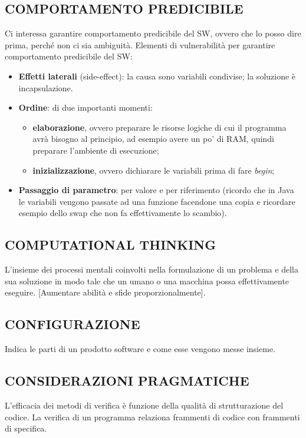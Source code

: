 		\subsection{COMPORTAMENTO PREDICIBILE}	\label{comportamentopredicibile} %
		Ci interessa garantire comportamento predicibile del SW, ovvero che lo posso dire prima, perché non ci sia ambiguità. Elementi di vulnerabilità per garantire comportamento predicibile del SW:
		\begin{itemize}
			\item \textbf{Effetti laterali} (side-effect): la causa sono variabili condivise; la soluzione è incapsulazione.
			\item \textbf{Ordine}: di due importanti momenti:
			\begin{itemize}
				\item \textbf{elaborazione}, ovvero preparare le risorse logiche di cui il programma avrà bisogno al principio, ad esempio avere un po' di RAM, quindi preparare l'ambiente di esecuzione;
				\item \textbf{inizializzazione}, ovvero dichiarare le variabili prima di fare \textit{begin};
			\end{itemize}
			\item \textbf{Passaggio di parametro}: per valore e per riferimento (ricordo che in Java le variabili vengono passate ad una funzione facendone una copia e ricordare esempio dello swap che non fa effettivamente lo scambio). %
		\end{itemize}
		
		
		\subsection{COMPUTATIONAL THINKING}  \label{computational}
		L'insieme dei processi mentali coinvolti nella formulazione di un problema e della sua soluzione in modo tale che un umano o una macchina possa effettivamente eseguire. [Aumentare abilità e sfide proporzionalmente].
		
		
		\subsection{CONFIGURAZIONE}  \label{configurazione}
		Indica le parti di un prodotto software e come esse vengono messe insieme.
		
		
		\subsection{CONSIDERAZIONI PRAGMATICHE}	\label{pragmatico}
		L’efficacia dei metodi di verifica è funzione della qualità di strutturazione del codice. La verifica di un programma relaziona frammenti di codice con frammenti di specifica.
		
